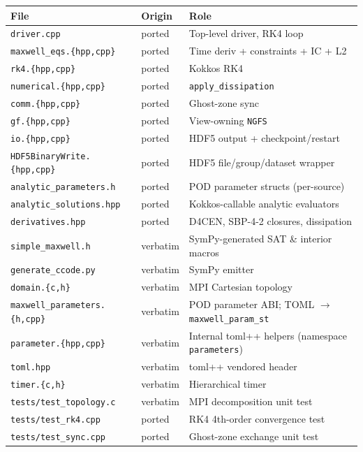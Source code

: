 \documentclass[11pt]{article}
\begin{document}
\begin{center}
\small
\begin{tabular}{@{}lll@{}}
\toprule
File & Origin & Role \\
\midrule
\texttt{driver.cpp}            & ported    & Top-level driver, RK4 loop \\
\texttt{maxwell\_eqs.\{hpp,cpp\}} & ported & Time deriv + constraints + IC + L2 \\
\texttt{rk4.\{hpp,cpp\}}       & ported    & Kokkos RK4 \\
\texttt{numerical.\{hpp,cpp\}} & ported    & \texttt{apply\_dissipation} \\
\texttt{comm.\{hpp,cpp\}}      & ported    & Ghost-zone sync \\
\texttt{gf.\{hpp,cpp\}}        & ported    & View-owning \texttt{NGFS} \\
\texttt{io.\{hpp,cpp\}}        & ported    & HDF5 output + checkpoint/restart \\
\texttt{HDF5BinaryWrite.\{hpp,cpp\}} & ported & HDF5 file/group/dataset wrapper \\
\texttt{analytic\_parameters.h}  & ported    & POD parameter structs (per-source) \\
\texttt{analytic\_solutions.hpp} & ported    & Kokkos-callable analytic evaluators \\
\texttt{derivatives.hpp}         & ported    & D4CEN, SBP-4-2 closures, dissipation \\
\texttt{simple\_maxwell.h}     & verbatim  & SymPy-generated SAT \& interior macros \\
\texttt{generate\_ccode.py}    & verbatim  & SymPy emitter \\
\texttt{domain.\{c,h\}}        & verbatim  & MPI Cartesian topology \\
\texttt{maxwell\_parameters.\{h,cpp\}} & verbatim & POD parameter ABI;
                                                    TOML $\to$ \texttt{maxwell\_param\_st} \\
\texttt{parameter.\{hpp,cpp\}}  & verbatim  & Internal toml++ helpers
                                              (namespace \texttt{parameters}) \\
\texttt{toml.hpp}              & verbatim  & toml++ vendored header \\
\texttt{timer.\{c,h\}}         & verbatim  & Hierarchical timer \\
\texttt{tests/test\_topology.c}& verbatim  & MPI decomposition unit test \\
\texttt{tests/test\_rk4.cpp}   & ported    & RK4 4th-order convergence test \\
\texttt{tests/test\_sync.cpp}  & ported    & Ghost-zone exchange unit test \\
\bottomrule
\end{tabular}
\end{center}
\end{document}
